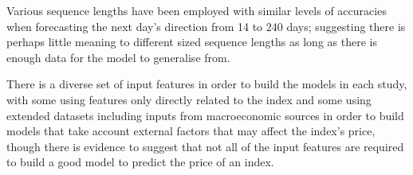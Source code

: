 Various sequence lengths have been employed with similar levels of accuracies when forecasting the next day's direction from 14 to 240 days; suggesting there is perhaps little meaning to different sized sequence lengths as long as there is enough data for the model to generalise from.

There is a diverse set of input features in order to build the models in each study, with some using features only directly related to the index and some using extended datasets including inputs from macroeconomic sources in order to build models that take account external factors that may affect the index's price, though there is evidence to suggest that not all of the input features are required to build a good model to predict the price of an index.